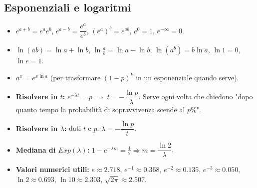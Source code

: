 \documentclass[12pt]{extarticle} %
\begin{document}
\subsection{Esponenziali e logaritmi}
\begin{itemize}
    \item $e^{a+b} = e^a e^b$, \quad $e^{a-b}=\dfrac{e^a}{e^b}$, \quad $(e^a)^b = e^{ab}$, \quad $e^0 = 1$, \quad $e^{-\infty}=0$.
    \item $\ln(ab) = \ln a + \ln b$, \quad $\ln\frac{a}{b} = \ln a - \ln b$, \quad $\ln(a^b) = b\ln a$, \quad $\ln 1 = 0$, \quad $\ln e = 1$.
    \item $a^x = e^{x\ln a}$ \; (per trasformare $(1-p)^k$ in un esponenziale quando serve).
    \item \textbf{Risolvere in $t$:} $e^{-\lambda t} = p \;\Longrightarrow\; t = -\dfrac{\ln p}{\lambda}$. {\footnotesize Serve ogni volta che chiedono "dopo quanto tempo la probabilità di sopravvivenza scende al $p$\%".}
    \item \textbf{Risolvere in $\lambda$:} dati $t$ e $p$: $\lambda = -\dfrac{\ln p}{t}$.
    \item \textbf{Mediana di $Exp(\lambda)$:} $1-e^{-\lambda m} = \tfrac12 \Rightarrow m = \dfrac{\ln 2}{\lambda}$.
    \item \textbf{Valori numerici utili:} $e \approx 2.718$, $e^{-1}\approx 0.368$, $e^{-2}\approx 0.135$, $e^{-3}\approx 0.050$, $\ln 2 \approx 0.693$, $\ln 10 \approx 2.303$, $\sqrt{2\pi}\approx 2.507$.
\end{itemize}
\end{document}
